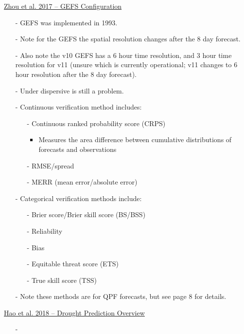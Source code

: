\documentclass[12pt, letterpaper]{article}
\begin{document}
	
    \underline{Zhou et al. 2017 -- GEFS Configuration}
    \begin{itemize}
    	\item[-] GEFS was implemented in 1993.
    	\item[-] Note for the GEFS the spatial resolution changes after the 8 day forecast.
    	\item[-] Also note the v10 GEFS has a 6 hour time resolution, and 3 hour time resolution for v11
    	         (unsure which is currently operational; v11 changes to 6 hour resolution after the 8 day
    	         forecast).
    	\item[-] Under dispersive is still a problem.
    	\item[-] Continuous verification method includes:
    	\begin{itemize}
    		\item[-] Continuous ranked probability score (CRPS)
    		\begin{itemize}
    			\item Measures the area difference between cumulative distributions of forecasts and
    			      observations
    		\end{itemize}
    	    \item[-] RMSE/spread
    	    \item[-] MERR (mean error/absolute error)
    	\end{itemize}
        \item[-] Categorical verification methods include:
        \begin{itemize}
        	\item[-] Brier score/Brier skill score (BS/BSS)
        	\item[-] Reliability
        	\item[-] Bias
        	\item[-] Equitable threat score (ETS)
        	\item[-] True skill score (TSS)
        \end{itemize}
        \item[-] Note these methods are for QPF forecasts, but see page 8 for details.
    \end{itemize}


	\underline{Hao et al. 2018 -- Drought Prediction Overview}
	\begin{itemize}
		\item[-] 
	\end{itemize}
\end{document}
